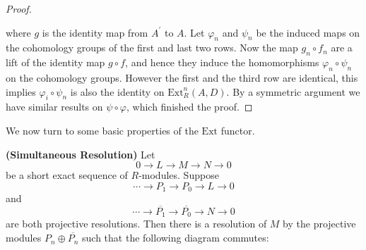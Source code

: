 \begin{proof}
\begin{center}
\begin{tikzpicture}[x=0.75pt,y=0.75pt,yscale=-1,xscale=1]
\end{tikzpicture}
\end{center}
where $g$ is the identity map from $A^\prime$ to $A$. Let $\varphi_n$ and $\psi_n$ be the induced maps on the cohomology groups of the first and last two rows. Now the map $g_n\circ f_n$ are a lift of the identity map $g\circ f$, and hence they induce the homomorphisms $\varphi_n\circ\psi_n$ on the cohomology groups. However the first and the third row are identical, this implies $\varphi_i\circ\psi_n$ is also the identity on $\mathrm{Ext}_R^n(A,D)$. By a symmetric argument we have similar results on $\psi\circ\varphi$, which finished the proof.
\end{proof}
We now turn to some basic properties of the $\mathrm{Ext}$ functor.
\begin{proposition}{\textbf{(Simultaneous Resolution)}}
Let 
$$
0\longrightarrow L\longrightarrow M\longrightarrow N\longrightarrow 0
$$
be a short exact sequence of $R$-modules. Suppose 
$$
\cdots \longrightarrow P_1\longrightarrow P_0\longrightarrow L\longrightarrow 0
$$
and 
$$
\cdots \longrightarrow \overline{P_1}\longrightarrow \overline{P_0}\longrightarrow N\longrightarrow 0
$$
are both projective resolutions. Then there is a resolution of $M$ by the projective modules $P_n\oplus\overline{P_n}$ such that the following diagram commutes: 
\begin{center}



\begin{tikzpicture}[x=0.75pt,y=0.75pt,yscale=-1,xscale=1]


\end{tikzpicture}
\end{center}
\end{proposition}
